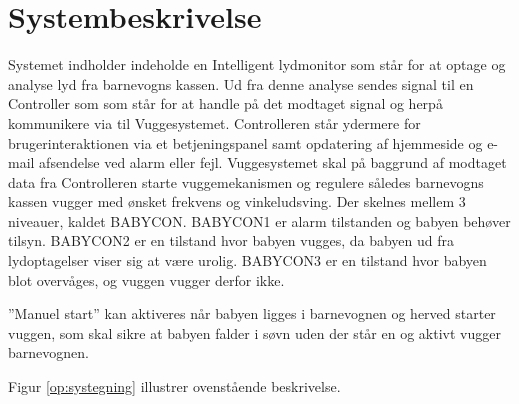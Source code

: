 \section{Systembeskrivelse}

Systemet indholder indeholde en Intelligent lydmonitor som står for at optage og analyse lyd fra barnevogns kassen. Ud fra denne analyse sendes signal til en Controller som som står for at handle på det modtaget signal og herpå kommunikere via \iic til Vuggesystemet. Controlleren står ydermere for brugerinteraktionen via et betjeningspanel samt opdatering af hjemmeside og e-mail afsendelse ved alarm eller fejl. Vuggesystemet skal på baggrund af modtaget data fra Controlleren starte vuggemekanismen og regulere således barnevogns kassen vugger med ønsket frekvens og vinkeludsving. Der skelnes mellem 3 niveauer, kaldet BABYCON. BABYCON1 er alarm tilstanden og babyen behøver tilsyn. BABYCON2 er en tilstand hvor babyen vugges, da babyen ud fra lydoptagelser viser sig at være urolig. BABYCON3 er en tilstand hvor babyen blot overvåges, og vuggen vugger derfor ikke. 

''Manuel start'' kan aktiveres når babyen ligges i barnevognen og herved starter vuggen, som skal sikre at babyen falder i søvn uden der står en og aktivt vugger barnevognen. 

Figur \ref{op:systegning} illustrer ovenstående beskrivelse. 

